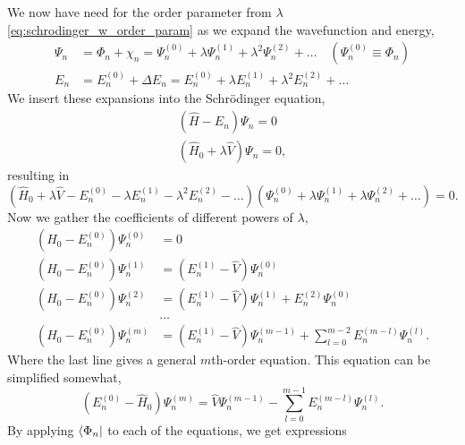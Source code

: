 We now have need for the order parameter from $\lambda$ \autoref{eq:schrodinger_w_order_param}
as we expand the wavefunction and energy,
\begin{equation}
    \begin{aligned}
        \Psi_n &= \Phi_n + \chi_n = \Psi_n^{(0)} + \lambda\Psi_n^{(1)} 
            + \lambda^2\Psi_n^{(2)} + \dots \quad (\Psi_n^{(0)} \equiv \Phi_n) \\
        E_n &= E_n^{(0)} + \Delta E_n = E_n^{(0)} + \lambda E_n^{(1)} 
            + \lambda^2 E_n^{(2)} + \dots 
    \end{aligned}
\end{equation}
We insert these expansions into the Schrödinger equation,
\begin{equation}
    \begin{aligned}
        (\hat{H} - E_n) \Psi_n = 0 \\
        (\hat{H}_0 + \lambda \hat{V})\Psi_n = 0,
    \end{aligned}
\end{equation}
resulting in 
\begin{equation}
    (\hat{H}_0 + \lambda \hat{V} - E_n^{(0)} - \lambda E_n^{(1)} 
        -\lambda^2 E_n^{(2)} - \dots)
    (\Psi_n^{(0)} + \lambda \Psi_n^{(1)} + \lambda \Psi_n^{(2)} + \dots) = 0.
\end{equation}
Now we gather the coefficients of different powers of $\lambda$,
\begin{align}
    (\hat{H}_0 - E_n^{(0)})\Psi_n^{(0)} &= 0 \\
    \label{eq:perturbation_lambda_power_first}
    (\hat{H}_0 - E_n^{(0)})\Psi_n^{(1)} &= (E_n^{(1)} - \hat{V})\Psi_n^{(0)}  \\
    (\hat{H}_0 - E_n^{(0)})\Psi_n^{(2)} &= (E_n^{(1)} - \hat{V})\Psi_n^{(1)}
        + E_n^{(2)}\Psi_n^{(0)} \\
        &\dots \nonumber \\
    \label{eq:perturbation_lambda_power_mth}
    (\hat{H}_0 - E_n^{(0)})\Psi_n^{(m)} &= (E_n^{(1)} - \hat{V})\Psi_n^{(m-1)}
        + \sum_{l=0}^{m-2} E_n^{(m-l)}\Psi_n^{(l)}.
\end{align}
Where the last line gives a general $m$th-order equation. This equation can be 
simplified somewhat,
\begin{equation}
    (E_n^{(0)} - \hat{H}_0)\Psi_n^{(m)} = \hat{V}\Psi_n^{(m-1)} 
        - \sum_{l=0}^{m-1}E_n^{(m-l)}\Psi_n^{(l)}.
\end{equation}
By applying $\bra{\Phi_n}$ to each of the equations, we get expressions 
